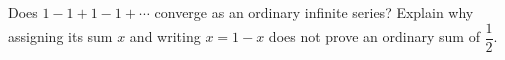 Does $1-1+1-1+\cdots$ converge as an ordinary infinite series? Explain why assigning its sum $x$ and writing $x=1-x$ does not prove an ordinary sum of $\dfrac{1}{2}$.

